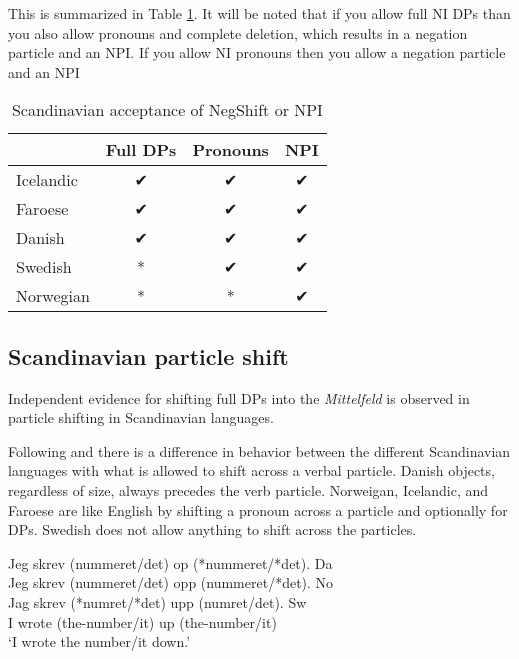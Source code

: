 \documentclass[12pt, letterpaper]{article}
\begin{document}
\ex This is summarized in Table \ref{tab:Paradigm}.
	\ea It will be noted that if you allow full NI DPs than you also allow pronouns and complete deletion, which results in a negation particle and an NPI.
	\ex If you allow NI pronouns then you allow a negation particle and an NPI
	\z 
\begin{table}[!ht]
	\centering
	\caption{Scandinavian acceptance of NegShift or NPI}
	\label{tab:Paradigm}
\begin{tabular}{lccc}
	\hline 
	& Full DPs & Pronouns & NPI\\
	\hline
	Icelandic & ✔︎ & ✔︎ & ✔︎ \\
	Faroese & ✔︎ & ✔︎ & ✔︎ \\
	Danish & ✔︎ & ✔︎ & ✔︎ \\
	Swedish & * & ✔︎ & ✔︎ \\
	Norwegian & * & * & ✔︎ \\
	\hline 
\end{tabular} 
\end{table}
\z 
\subsection{Scandinavian particle shift} \label{sec:Particles}
\ea Independent evidence for shifting full DPs into the \emph{Mittelfeld} is observed in particle shifting in Scandinavian languages. 

\ex Following \citet[2]{holmbergRemarksHolmbergGeneralization1999} and \citet{faarlundSyntaxMainlandScandinavian2019} there is a difference in behavior between the different Scandinavian languages with what is allowed to shift across a verbal particle.
	\ea Danish objects, regardless of size, always precedes the verb particle. 
	\ex Norweigan, Icelandic, and Faroese are like English by shifting a pronoun across a particle and optionally for DPs.
	\ex Swedish does not allow anything to shift across the particles. 
	\z 

\ex \gllll Jeg skrev (nummeret/det) op (*nummeret/*det). \hfill Da\\
		Jeg skrev (nummeret/det) opp (nummeret/*det). \hfill No\\
		Jag skrev (*numret/*det) upp (numret/det). \hfill Sw\\
		I wrote (the-number/it) up (the-number/it)\\
\glt `I wrote the number/it down.'
\end{document}
